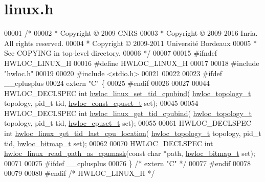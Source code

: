 \hypertarget{a00140_source}{}\section{linux.\+h}
\label{a00140_source}

\begin{DoxyCode}
00001 \textcolor{comment}{/*}
00002 \textcolor{comment}{ * Copyright © 2009 CNRS}
00003 \textcolor{comment}{ * Copyright © 2009-2016 Inria.  All rights reserved.}
00004 \textcolor{comment}{ * Copyright © 2009-2011 Université Bordeaux}
00005 \textcolor{comment}{ * See COPYING in top-level directory.}
00006 \textcolor{comment}{ */}
00007 
00015 \textcolor{preprocessor}{#ifndef HWLOC\_LINUX\_H}
00016 \textcolor{preprocessor}{#define HWLOC\_LINUX\_H}
00017 
00018 \textcolor{preprocessor}{#include "hwloc.h"}
00019 
00020 \textcolor{preprocessor}{#include <stdio.h>}
00021 
00022 
00023 \textcolor{preprocessor}{#ifdef \_\_cplusplus}
00024 \textcolor{keyword}{extern} \textcolor{stringliteral}{"C"} \{
00025 \textcolor{preprocessor}{#endif}
00026 
00027 
00044 HWLOC\_DECLSPEC \textcolor{keywordtype}{int} \hyperlink{a00214_ga630e699c56b5f3d2e534b475944c216e}{hwloc\_linux\_set\_tid\_cpubind}(
      \hyperlink{a00186_ga9d1e76ee15a7dee158b786c30b6a6e38}{hwloc\_topology\_t} topology, pid\_t tid, \hyperlink{a00183_ga1f784433e9b606261f62d1134f6a3b25}{hwloc\_const\_cpuset\_t} \textcolor{keyword}{set});
00045 
00054 HWLOC\_DECLSPEC \textcolor{keywordtype}{int} \hyperlink{a00214_gaddcb985cb56337a4d6693cee72e7bf94}{hwloc\_linux\_get\_tid\_cpubind}(
      \hyperlink{a00186_ga9d1e76ee15a7dee158b786c30b6a6e38}{hwloc\_topology\_t} topology, pid\_t tid, \hyperlink{a00183_ga4bbf39b68b6f568fb92739e7c0ea7801}{hwloc\_cpuset\_t} \textcolor{keyword}{set});
00055 
00061 HWLOC\_DECLSPEC \textcolor{keywordtype}{int} \hyperlink{a00214_gacc7945c2d06c6db1e58f8fd953009134}{hwloc\_linux\_get\_tid\_last\_cpu\_location}(
      \hyperlink{a00186_ga9d1e76ee15a7dee158b786c30b6a6e38}{hwloc\_topology\_t} topology, pid\_t tid, \hyperlink{a00205_gaa3c2bf4c776d603dcebbb61b0c923d84}{hwloc\_bitmap\_t} \textcolor{keyword}{set});
00062 
00070 HWLOC\_DECLSPEC \textcolor{keywordtype}{int} \hyperlink{a00214_gaf72d83e273803226ce772973e37b85de}{hwloc\_linux\_read\_path\_as\_cpumask}(\textcolor{keyword}{const} \textcolor{keywordtype}{char} *path, 
      \hyperlink{a00205_gaa3c2bf4c776d603dcebbb61b0c923d84}{hwloc\_bitmap\_t} \textcolor{keyword}{set});
00071 
00075 \textcolor{preprocessor}{#ifdef \_\_cplusplus}
00076 \} \textcolor{comment}{/* extern "C" */}
00077 \textcolor{preprocessor}{#endif}
00078 
00079 
00080 \textcolor{preprocessor}{#endif }\textcolor{comment}{/* HWLOC\_LINUX\_H */}\textcolor{preprocessor}{}
\end{DoxyCode}
